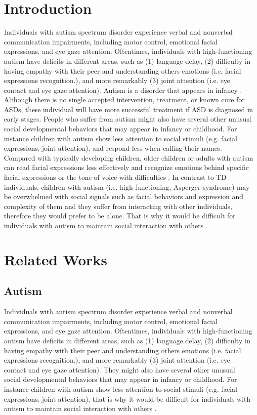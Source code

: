 \documentclass[conference]{IEEEtran}
\begin{document}
\section{Introduction}
Individuals with autism spectrum disorder experience verbal and nonverbal
communication impairments, including motor control, emotional facial expressions, and
eye gaze attention. Oftentimes, individuals with high-functioning autism have deficits in
different areas, such as (1) language delay, (2) difficulty in having empathy with their peer
and understanding others emotions (i.e. facial expressions recognition.), and more
remarkably (3) joint attention (i.e. eye contact and eye gaze attention). Autism is a disorder
that appears in infancy \cite{Epidemiology1966}. Although there is no single accepted intervention, treatment,
or known cure for ASDs, these individual will have more successful treatment if ASD is
diagnosed in early stages. People who suffer from autism might also have several other unusual social developmental
behaviors that may appear in infancy or childhood. For instance children with autism show
less attention to social stimuli (e.g. facial expressions, joint attention), and respond less
when calling their names. Compared with typically developing children, older children or
adults with autism can read facial expressions less effectively and recognize emotions
behind specific facial expressions or the tone of voice with difficulties \cite{LogicScien1959}. In contrast to
TD individuals, children with autism (i.e. high-functioning, Asperger syndrome) may be
overwhelmed with social signals such as facial behaviors and expression and complexity
of them and they suffer from interacting with other individuals, therefore they would prefer
to be alone. That is why it would be difficult for individuals with autism to maintain social
interaction with others \cite{InfantileAutism1975}.\\

\section{Related Works}

\subsection{Autism}
Individuals with autism spectrum disorder experience verbal and nonverbal
communication impairments, including motor control, emotional facial expressions, and
eye gaze attention. Oftentimes, individuals with high-functioning autism have deficits in
different areas, such as (1) language delay, (2) difficulty in having empathy with their peer
and understanding others emotions (i.e. facial expressions recognition.), and more
remarkably (3) joint attention (i.e. eye contact and eye gaze attention). 
They might also have several other unusual social developmental
behaviors that may appear in infancy or childhood. For instance children with autism show
less attention to social stimuli (e.g. facial expressions, joint attention),
that is why it would be difficult for individuals with autism to maintain social
interaction with others \cite{InfantileAutism1975}.\\
\end{document}
